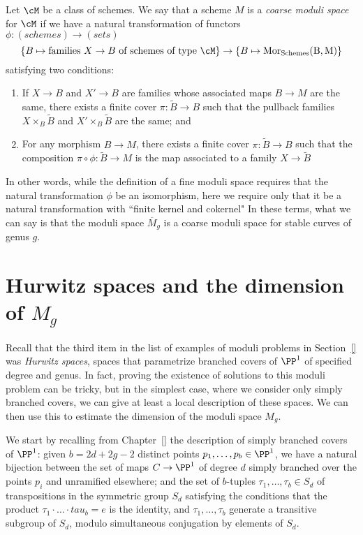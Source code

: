 \begin{definition}
Let $\cM$ be a class of schemes. We say that a scheme $M$ is a \emph{coarse moduli space} for $\cM$ if we have a natural transformation of functors $\phi : (schemes) \to (sets)$
$$
\{ B \mapsto \text{families $X \to B$ of schemes of type $\cM$}\} \to \{ B\mapsto \rm{Mor}_{\rm Schemes}(B, M) \}
$$
satisfying two conditions:
\begin{enumerate}
\item If $X \to B$ and $X' \to B$ are families whose associated maps $B \to M$ are the same, there exists a finite cover $\pi : \tilde B \to B$ such that the pullback families $X \times_B \tilde B$ and $X' \times_B \tilde B$ are the same; and
\item For any morphism $B \to M$, there exists a finite cover $\pi : \tilde B \to B$ such that the composition $\pi \circ \phi : \tilde B \to M$ is the map associated to a family $X \to \tilde B$
\end{enumerate}
\end{definition}

In other words, while the definition of a fine moduli space requires that the natural transformation $\phi$ be an isomorphism, here we require only that it be a natural transformation with ``finite kernel and cokernel" In these terms, what we can say is that the moduli space $\overline M_g$ is a coarse moduli space for stable curves of genus $g$.

\section{Hurwitz spaces and the dimension of $M_g$}\label{Hurwitz section}

Recall that the third item in the list of examples of moduli problems in Section~\ref{} was \emph{Hurwitz spaces}, spaces that parametrize branched covers of $\PP^1$ of specified degree and genus. In fact, proving the existence of solutions to this moduli problem can be tricky, but in the simplest case, where we consider only simply branched covers, we can give at least a local description of these spaces. We can then use this to estimate the dimension of the moduli space $M_g$.

We start by recalling from Chapter~\ref{} the description of simply branched covers of $\PP^1$: given $b = 2d + 2g - 2$ distinct points $p_1,\dots,p_b \in \PP^1$, we have a natural bijection between the set of maps $C \to \PP^1$ of degree $d$ simply branched over the points $p_i$ and unramified elsewhere; and the set of $b$-tuples $\tau_1, \dots, \tau_b \in S_d$ of transpositions in the symmetric group $S_d$
satisfying the conditions that the product $\tau_1\cdot \dots \cdot tau_b = e$ is the identity, and $\tau_1, \dots, \tau_b$ generate a transitive subgroup of $S_d$, modulo simultaneous conjugation by elements of $S_d$. 

